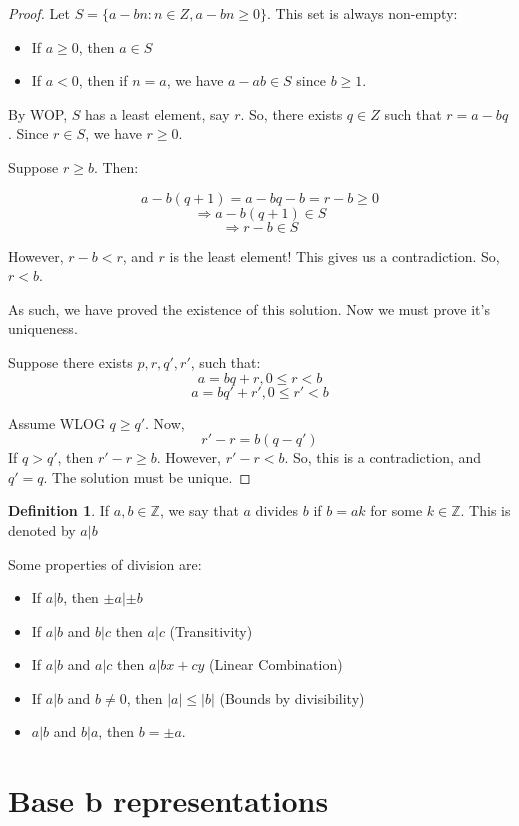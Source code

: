 \documentclass[12pt,letterpaper]{amsbook}
\theoremstyle{definition}
\newtheorem{definition}{Definition} %
\newcommand{\Z}{\mathbb{Z}}
\begin{document}
\begin{proof}

Let $S = \{a - bn : n \in Z, a-bn \geq 0\}$. This set is always non-empty:
\begin{itemize}
  \item If $a \geq 0$, then $a \in S$
  \item If $a<0$, then if $n = a$, we have $a-ab \in S$ since $b \geq 1$.
\end{itemize}

By WOP, $S$ has a least element, say $r$. So, there exists $q \in Z$ such that $r = a-bq$. Since $r \in S$, we have $r \geq 0$.

Suppose $r \geq b$. Then:

\[a-b(q+1) = a-bq-b = r-b \geq 0\]
\[ \Rightarrow a-b(q+1) \in S\]
\[\Rightarrow r-b \in S\]

However, $r-b < r$, and $r$ is the least element! This gives us a contradiction. So, $r < b$.

As such, we have proved the existence of this solution. Now we must prove it's uniqueness.

Suppose there exists $p,r,q',r'$, such that:
\[a = bq+r, 0 \leq r < b\]
\[a = bq'+r', 0 \leq r' < b\]

Assume WLOG $q \geq q'$. Now,
\[r'-r = b(q-q')\]
If $q > q'$, then $r'-r \geq b$. However, $r'-r < b$. So, this is a contradiction, and $q' = q$. The solution must be unique.

\end{proof}

\begin{definition}
  If $a,b \in \Z$, we say that $a$ divides $b$ if $b=ak$ for some $k \in \Z$. This is denoted by $a|b$
\end{definition}

Some properties of division are:

\begin{itemize}
  \item If $a|b$, then $\pm a | \pm b$
  \item If $a|b$ and $b|c$ then $a|c$ (Transitivity)
  \item If $a|b$ and $a|c$ then $a|bx+cy$ (Linear Combination)
  \item If $a|b$ and $b \neq 0$, then $|a| \leq |b|$ (Bounds by divisibility)
  \item $a|b$ and $b|a$, then $b = \pm a$.
\end{itemize}

\section{Base b representations}
\end{document}
